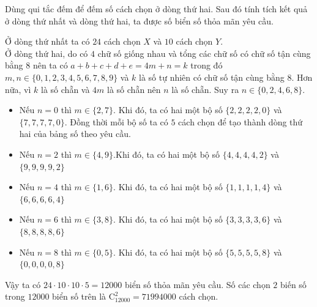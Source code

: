 \begin{vd}
{\begin{tongquat}
\begin{itemize}
\begin{itemize}
				\end{itemize}
				Dùng qui tắc đếm để đếm số cách chọn ở dòng thứ hai. Sau đó tính tích kết quả ở dòng thứ nhất và dòng thứ hai, ta được số biển số thỏa mãn yêu cầu.
			\end{itemize}
		\end{tongquat}
		\noindent Ở dòng thứ nhất ta có $24$ cách chọn $X$ và $10$ cách chọn $Y$.\\
		Ở dòng thứ hai, do có $4$ chữ số giống nhau và tổng các chữ số có chữ số tận cùng bằng $8$ nên ta có $a+b+c+d+e=4m+n=k$ trong đó $m,n\in\{0,1,2,3,4,5,6,7,8,9\}$ và $k$ là số tự nhiên có chữ số tận cùng bằng $8$. Hơn nữa, vì $k$ là số chẵn và $4m$ là số chẵn nên $n$ là số chẵn. Suy ra $n\in\{0,2,4,6,8\}$.
		\begin{itemize}
			\item Nếu $n=0$ thì $m\in\{2,7\}$. Khi đó, ta có hai một bộ số $\{2,2,2,2,0\}$ và $\{7,7,7,7,0\}$. Đồng thời mỗi bộ số ta có $5$ cách chọn để tạo thành dòng thứ hai của bảng số theo yêu cầu.
			\item Nếu $n=2$ thì $m\in\{4,9\}$.Khi đó, ta có hai một bộ số $\{4,4,4,4,2\}$ và $\{9,9,9,9,2\}$
			\item Nếu $n=4$ thì $m\in\{1,6\}$. Khi đó, ta có hai một bộ số $\{1,1,1,1,4\}$ và $\{6,6,6,6,4\}$
			\item Nếu $n=6$ thì $m\in\{3,8\}$. Khi đó, ta có hai một bộ số $\{3,3,3,3,6\}$ và $\{8,8,8,8,6\}$
			\item Nếu $n=8$ thì $m\in\{0,5\}$. Khi đó, ta có hai một bộ số $\{5,5,5,5,8\}$ và $\{0,0,0,0,8\}$
		\end{itemize}
		Vậy ta có $24\cdot 10 \cdot 10\cdot 5=12000$ biển số thỏa mãn yêu cầu. Số các chọn $2$ biến số trong $12000$ biển số trên là $\mathrm{C}^2_{12000}=71994000$ cách chọn.
	}
\end{vd}
